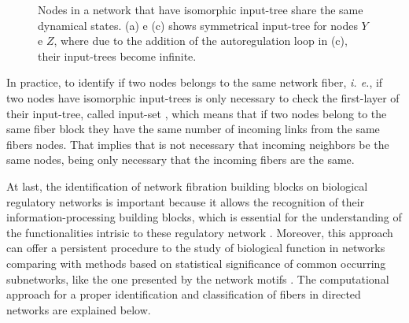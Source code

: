 \documentclass[12pt]{diazessay} %
\begin{document}
\begin{figure}[h]
	\caption{Nodes in a network that have isomorphic input-tree share the same dynamical states. (a) e (c) shows symmetrical input-tree for nodes $Y$ e $Z$, where due to the addition of the autoregulation loop in (c), their input-trees become infinite.}
	\label{fig:inputex}
\end{figure}

In practice, to identify if two nodes belongs to the same network fiber, \textit{i. e.}, if two nodes have isomorphic input-trees is only necessary to check the first-layer of their input-tree, called input-set \cite{norris1995}, which means that if two nodes belong to the same fiber block they have the same number of incoming links from the same fibers nodes. That implies that is not necessary that incoming neighbors be the same nodes, being only necessary that the incoming fibers are the same. 

At last, the identification of network fibration building blocks on biological regulatory networks is important because it allows the recognition of their information-processing building blocks, which is essential for the understanding of the functionalities intrisic to these regulatory network \cite{transistor2019}. Moreover, this approach can offer a persistent procedure to the study of biological function in networks comparing with methods based on statistical significance of common occurring subnetworks, like the one presented by the network motifs \cite{motifs2002}. The computational approach for a proper identification and classification of fibers in directed networks are explained below.
\end{document}
